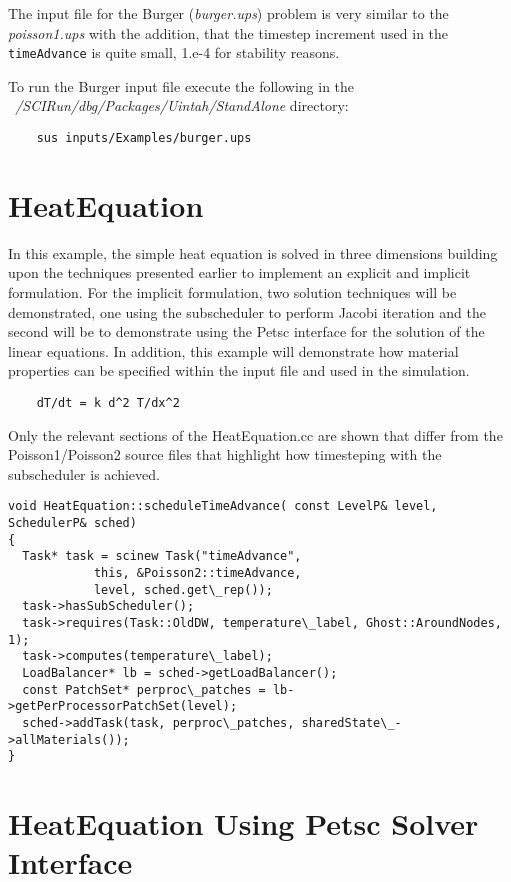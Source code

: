 \documentclass[12pt]{report}
\begin{document}
The input file for the Burger (\emph{burger.ups}) problem is very
similar to the \emph{poisson1.ups} with the addition, that the
timestep increment used in the \texttt{timeAdvance} is quite small,
1.e-4 for stability reasons.

To run the Burger input file execute the following in the
\emph{~/SCIRun/dbg/Packages/Uintah/StandAlone} directory:

\begin{verbatim}
	sus inputs/Examples/burger.ups
\end{verbatim}

\section{HeatEquation}

In this example, the simple heat equation is solved in three
dimensions building upon the techniques presented earlier to implement
an explicit and implicit formulation.  For the implicit formulation,
two solution techniques will be demonstrated, one using the
subscheduler to perform Jacobi iteration and the second will be to
demonstrate using the Petsc interface for the solution of the linear
equations.  In addition, this example will demonstrate how material
properties can be specified within the input file and used in the
simulation.

\begin{verbatim}
	dT/dt = k d^2 T/dx^2  
\end{verbatim}

Only the relevant sections of the HeatEquation.cc are shown that
differ from the Poisson1/Poisson2 source files that highlight how
timesteping with the subscheduler is achieved.

\begin{verbatim}
void HeatEquation::scheduleTimeAdvance( const LevelP& level, SchedulerP& sched)
{
  Task* task = scinew Task("timeAdvance",
			this, &Poisson2::timeAdvance,
			level, sched.get\_rep());
  task->hasSubScheduler();
  task->requires(Task::OldDW, temperature\_label, Ghost::AroundNodes, 1);
  task->computes(temperature\_label);
  LoadBalancer* lb = sched->getLoadBalancer();
  const PatchSet* perproc\_patches = lb->getPerProcessorPatchSet(level);
  sched->addTask(task, perproc\_patches, sharedState\_->allMaterials());
}

\end{verbatim}

\section{HeatEquation Using Petsc Solver Interface}
\end{document}
